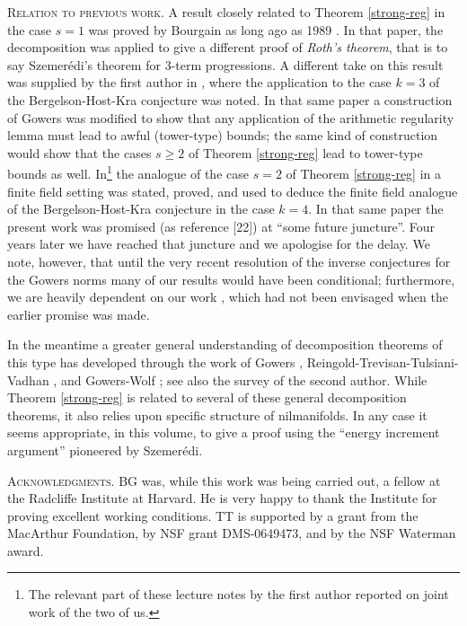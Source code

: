 \documentclass[11pt,reqno]{amsart}
\numberwithin{equation}{section}
\theoremstyle{plain}
\theoremstyle{definition}
\renewcommand{\geq}{\geqslant}
\newcommand\1{{\bf 1}}
\newcommand\2{{\bf 2}}
\begin{document}
\textsc{Relation to previous work.} A result closely related to Theorem \ref{strong-reg} in the case $s = 1$ was proved by Bourgain as long ago as 1989 \cite{bourgain}. In that paper, the decomposition was applied to give a different proof of \emph{Roth's theorem}, that is to say Szemer\'edi's theorem for $3$-term progressions. A different take on this result was supplied by the first author in \cite{green-regularity}, where the application to the case $k = 3$ of the Bergelson-Host-Kra conjecture was noted. In that same paper a construction of Gowers \cite{gowers-lower} was modified to show that any application of the arithmetic regularity lemma must lead to awful (tower-type) bounds; the same kind of construction would show that the cases $s \geq 2$ of Theorem \ref{strong-reg} lead to tower-type bounds as well. In\footnote{The relevant part of these lecture notes by the first author reported on joint work of the two of us.} \cite{green-montreal} the analogue of the case $s = 2$ of Theorem \ref{strong-reg} in a finite field setting was stated, proved, and used to deduce the finite field analogue of the Bergelson-Host-Kra conjecture in the case $k = 4$. In that same paper the present work was promised (as reference [22]) at ``some future juncture''. Four years later we have reached that juncture and we apologise for the delay. We note, however, that until the very recent resolution of the inverse conjectures for the Gowers norms \cite{green-tao-ziegler-u4inverse,uk-inverse} many of our results would have been conditional; furthermore, we are heavily dependent on our work \cite{green-tao-nilratner}, which had not been envisaged when the earlier promise was made.

In the meantime a greater general understanding of decomposition theorems of this type has developed through the work of Gowers \cite{gowers-regularity}, Reingold-Trevisan-Tulsiani-Vadhan \cite{rttv}, and Gowers-Wolf \cite{gowers-wolf-1,gowers-wolf-2,gowers-wolf-3}; see also the survey \cite{tao-focs} of the second author. While Theorem \ref{strong-reg} is related to several of these general decomposition theorems, it also relies upon specific structure of nilmanifolds. In any case it seems appropriate, in this volume, to give a proof using the ``energy increment argument'' pioneered by Szemer\'edi.

\textsc{Acknowledgments.}  BG was, while this work was being carried out, a fellow at the Radcliffe Institute at Harvard. He is very happy to thank the Institute for proving excellent working conditions.
TT is supported by a grant from the MacArthur Foundation, by NSF grant DMS-0649473, and by the NSF Waterman award.
\end{document}
